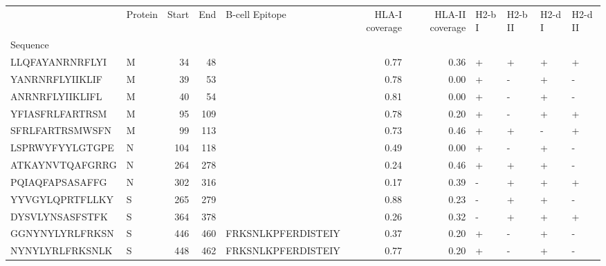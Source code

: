\begin{tabular}{llrrlrrllll}
\toprule
{} & Protein &  Start &   End &      B-cell Epitope &  HLA-I coverage &  HLA-II coverage & H2-b I & H2-b II & H2-d I & H2-d II \\
Sequence        &         &        &       &                     &                 &                  &        &         &        &         \\
\midrule
LLQFAYANRNRFLYI &       M &     34 &    48 &                     &            0.77 &             0.36 &      + &       + &      + &       + \\
YANRNRFLYIIKLIF &       M &     39 &    53 &                     &            0.78 &             0.00 &      + &       - &      + &       - \\
ANRNRFLYIIKLIFL &       M &     40 &    54 &                     &            0.81 &             0.00 &      + &       - &      + &       - \\
YFIASFRLFARTRSM &       M &     95 &   109 &                     &            0.78 &             0.20 &      + &       - &      + &       + \\
SFRLFARTRSMWSFN &       M &     99 &   113 &                     &            0.73 &             0.46 &      + &       + &      - &       + \\
LSPRWYFYYLGTGPE &       N &    104 &   118 &                     &            0.49 &             0.00 &      + &       - &      + &       - \\
ATKAYNVTQAFGRRG &       N &    264 &   278 &                     &            0.24 &             0.46 &      + &       + &      + &       - \\
PQIAQFAPSASAFFG &       N &    302 &   316 &                     &            0.17 &             0.39 &      - &       + &      + &       + \\
YYVGYLQPRTFLLKY &       S &    265 &   279 &                     &            0.88 &             0.23 &      - &       + &      + &       - \\
DYSVLYNSASFSTFK &       S &    364 &   378 &                     &            0.26 &             0.32 &      - &       + &      + &       + \\
GGNYNYLYRLFRKSN &       S &    446 &   460 &  FRKSNLKPFERDISTEIY &            0.37 &             0.20 &      + &       - &      + &       - \\
NYNYLYRLFRKSNLK &       S &    448 &   462 &  FRKSNLKPFERDISTEIY &            0.77 &             0.20 &      + &       - &      + &       - \\

\end{tabular}
